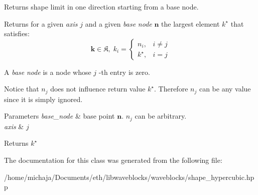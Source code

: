 Returns shape limit in one direction starting from a base node. 

Returns for a given {\itshape axis} $ j $ and a given {\itshape base} {\itshape node} $ \boldsymbol{n} $ the largest element $ k^\star $ that satisfies\+: \[ \boldsymbol{k} \in \mathfrak{K}, \; k_i = \begin{cases} n_i,& i \neq j\\ k^\star, & i = j \end{cases} \]

A {\itshape base} {\itshape node} is a node whose $ j $ -\/th entry is zero.

Notice that $ n_j $ does not influence return value $ k^\star $. Therefore $ n_j $ can be any value since it is simply ignored.


\begin{DoxyParams}{Parameters}
{\em base\+\_\+node} & base point $ \boldsymbol{n} $. $ n_j $ can be arbitrary. \\
\hline
{\em axis} & $ j $ \\
\hline
\end{DoxyParams}
\begin{DoxyReturn}{Returns}
$ k^\star $ 
\end{DoxyReturn}


The documentation for this class was generated from the following file\+:\begin{DoxyCompactItemize}
\item 
/home/michaja/\+Documents/eth/libwaveblocks/waveblocks/shape\+\_\+hypercubic.\+hpp\end{DoxyCompactItemize}
